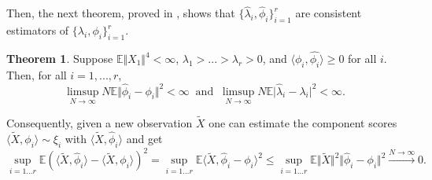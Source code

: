 \documentclass[10pt, a4paper]{report}
\newcommand{\E}[0]{\mathbb{E}}
\theoremstyle{definition}
\newtheorem{theorem}{Theorem}
\theoremstyle{remark}
\begin{document}
Then, the next theorem, proved in \cite[Section 2.7]{inference}, shows that $\{\hat{\lambda}_i,\hat{\phi}_i\}_{i=1}^r$ are consistent estimators of $\{\lambda_i,\phi_i\}_{i=1}^r$.
\begin{theorem}
	Suppose $\E\Vert X_1 \Vert^4 < \infty$, $\lambda_1>...>\lambda_r>0$, and $\langle \phi_i,\hat{\phi_i}\rangle\geq 0$ for all $i$. Then, for all $i=1,...,r$,
	$$\limsup_{N\to \infty} N \E\Vert \hat{\phi}_i - \phi_i\Vert^2 < \infty \ \text{ and } \ \limsup_{N\to \infty} N \E\vert \hat{\lambda}_i - \lambda_i\vert^2 < \infty.$$
\end{theorem}
Consequently, given a new observation $\tilde{X}$ one can estimate the component scores $\langle \tilde{X}, \phi_i\rangle \sim \xi_i$ with $\langle \tilde{X}, \hat{\phi}_i\rangle$ and get 
$$\sup_{i=1...r}\E\left( \langle \tilde{X}, \hat{\phi}_i\rangle - \langle \tilde{X}, \phi_i\rangle\right)^2 = \sup_{i=1...r}\E\langle \tilde{X}, \hat{\phi}_i-\phi_i\rangle^2 \leq \sup_{i=1...r}\E\Vert \tilde{X}\Vert^2 \Vert \hat{\phi}_i-\phi_i\Vert^2 \stackrel{N\to \infty}{\longrightarrow} 0.$$
\end{document}
